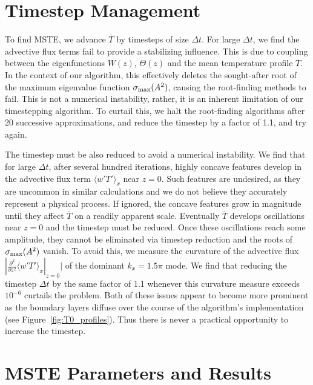 \documentclass[reprint,amsmath,amssymb,aps,nofootinbib]{revtex4-1}
\newcommand{\eq}[1]{(\ref{#1})}
\begin{document}
\section{Timestep Management} \label{sec:timestep}
To find MSTE, we advance $\overline{T}$ by timesteps of size $\Delta t$.
For large $\Delta t$, we find the advective flux terms fail to provide a stabilizing influence.
This is due to coupling between the eigenfunctions $W(z)$, $\Theta(z)$ and the mean temperature profile $\overline{T}$.
In the context of our algorithm, this effectively deletes the sought-after root of the maximum eigenvalue function $\sigma_{\rm{max}}(A^2)$, causing the root-finding methods to fail. 
This is not a numerical instability, rather, it is an inherent limitation of our timestepping algorithm.
To curtail this, we halt the root-finding algorithms after 20 successive approximations, and reduce the timestep by a factor of 1.1, and try again.

The timestep must be also reduced to avoid a numerical instability.
We find that for large $\Delta t$, after several hundred iterations, highly concave features develop in the advective flux term $\langle w'T' \rangle_x$ near $z=0$. 
Such features are undesired, as they are uncommon in similar calculations \cite{Malkus_1954} and we do not believe they accurately represent a physical process.
If ignored, the concave features grow in magnitude until they affect $\overline{T}$ on a readily apparent scale.
Eventually $\overline{T}$ develops oscillations near $z = 0$ and the timestep must be reduced.
Once these oscillations reach some amplitude, they cannot be eliminated via timestep reduction and the roots of $\sigma_{\rm{max}}(A^2)$ vanish.
To avoid this, we measure the curvature of the advective flux $|\frac{\partial^2}{\partial z^2} \langle w'T' \rangle_x|_{z=0}|$ of the dominant $k_x = 1.5\pi$ mode.
We find that reducing the timestep $\Delta t$ by the same factor of 1.1 whenever this curvature measure exceeds $10^{-6}$ curtails the problem.
Both of these issues appear to become more prominent as the boundary layers diffuse over the course of the algorithm's implementation (see Figure~\ref{fig:T0_profiles}).
Thus there is never a practical opportunity to increase the timestep.

\onecolumngrid
\section{MSTE Parameters and Results}\label{sec:tables}
\end{document}
